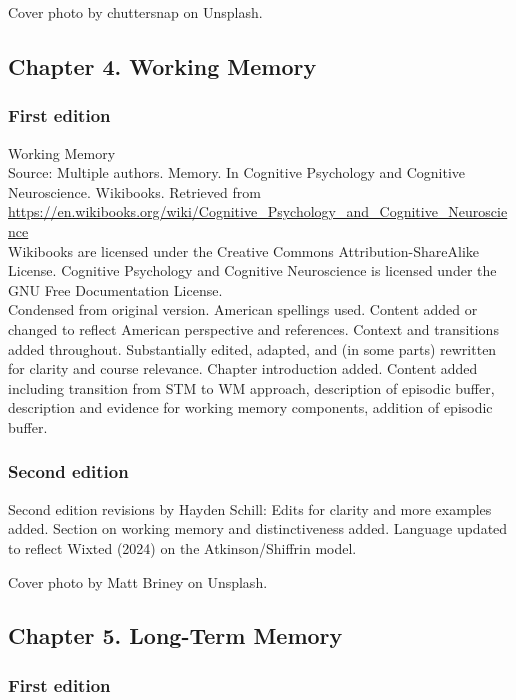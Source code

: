 \documentclass[
]{krantz}
\begin{document}
Cover photo by chuttersnap on Unsplash.

\subsection*{Chapter 4. Working Memory}\label{chapter-4.-working-memory}


\subsubsection*{First edition}\label{first-edition-4}


Working Memory\\
Source: Multiple authors. Memory. In Cognitive Psychology and Cognitive Neuroscience. Wikibooks. Retrieved from \url{https://en.wikibooks.org/wiki/Cognitive_Psychology_and_Cognitive_Neuroscience}\\
Wikibooks are licensed under the Creative Commons Attribution-ShareAlike License.
Cognitive Psychology and Cognitive Neuroscience is licensed under the GNU Free Documentation License.\\
Condensed from original version. American spellings used. Content added or changed to reflect American perspective and references. Context and transitions added throughout. Substantially edited, adapted, and (in some parts) rewritten for clarity and course relevance. Chapter introduction added. Content added including transition from STM to WM approach, description of episodic buffer, description and evidence for working memory components, addition of episodic buffer.

\subsubsection*{Second edition}\label{second-edition-4}


Second edition revisions by Hayden Schill: Edits for clarity and more examples added. Section on working memory and distinctiveness added. Language updated to reflect Wixted (2024) on the Atkinson/Shiffrin model.

Cover photo by Matt Briney on Unsplash.

\subsection*{Chapter 5. Long-Term Memory}\label{chapter-5.-long-term-memory}


\subsubsection*{First edition}\label{first-edition-5}
\end{document}
